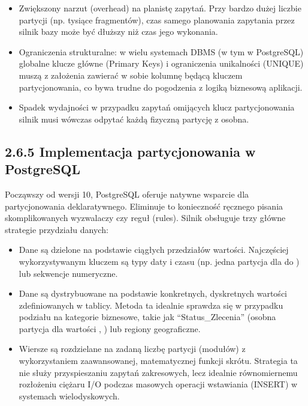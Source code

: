 \documentclass[a4paper,11pt,english,openany,oneside]{sphinxmanual}
\begin{document}
\sphinxAtStartPar
{}
\begin{itemize}
\item {} 
\sphinxAtStartPar
Zwiększony narzut (overhead) na planistę zapytań. Przy bardzo dużej liczbie partycji (np. tysiące fragmentów), czas samego planowania zapytania przez silnik bazy może być dłuższy niż czas jego wykonania.

\item {} 
\sphinxAtStartPar
Ograniczenia strukturalne: w wielu systemach DBMS (w tym w PostgreSQL) globalne klucze główne (Primary Keys) i ograniczenia unikalności (UNIQUE) muszą z założenia zawierać w sobie kolumnę będącą kluczem partycjonowania, co bywa trudne do pogodzenia z logiką biznesową aplikacji.

\item {} 
\sphinxAtStartPar
Spadek wydajności w przypadku zapytań omijących klucz partycjonowania \textendash{} silnik musi wówczas odpytać każdą fizyczną partycję z osobna.

\end{itemize}


\subsection{2.6.5 Implementacja partycjonowania w PostgreSQL}
\label{\detokenize{rozdzial_2/rozdzial_26/index:implementacja-partycjonowania-w-postgresql}}
\sphinxAtStartPar
Począwszy od wersji 10, PostgreSQL oferuje natywne wsparcie dla partycjonowania deklaratywnego. Eliminuje to konieczność ręcznego pisania skomplikowanych wyzwalaczy czy reguł (rules). Silnik obsługuje trzy główne strategie przydziału danych:
\begin{itemize}
\item {} 
\sphinxAtStartPar
{} Dane są dzielone na podstawie ciągłych przedziałów wartości. Najczęściej wykorzystywanym kluczem są typy daty i czasu (np. jedna partycja dla  do ) lub sekwencje numeryczne.

\item {} 
\sphinxAtStartPar
{} Dane są dystrybuowane na podstawie konkretnych, dyskretnych wartości zdefiniowanych w tablicy. Metoda ta idealnie sprawdza się w przypadku podziału na kategorie biznesowe, takie jak “Status\_Zlecenia” (osobna partycja dla wartości , ) lub regiony geograficzne.

\item {} 
\sphinxAtStartPar
{} Wiersze są rozdzielane na zadaną liczbę partycji (modułów) z wykorzystaniem zaawansowanej, matematycznej funkcji skrótu. Strategia ta nie służy przyspieszaniu zapytań zakresowych, lecz idealnie równomiernemu rozłożeniu ciężaru I/O podczas masowych operacji wstawiania (INSERT) w systemach wielodyskowych.

\end{itemize}
\end{document}
